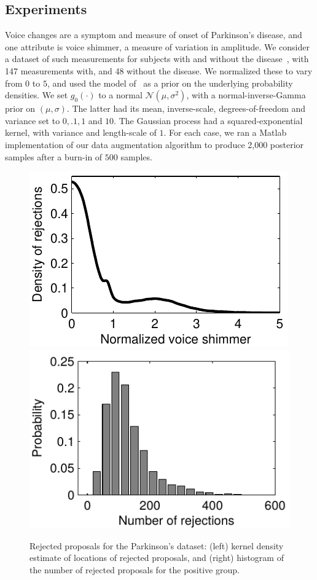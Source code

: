 \subsection{Experiments}   \label{sec:gpds_expt}

  Voice changes are a symptom and measure of onset of Parkinson's disease, and one attribute is voice shimmer, a measure of variation in
  amplitude. We consider a dataset of such measurements for subjects with and without the disease~\citep{little07}, with
147 measurements with, and 48 without the disease.
We normalized these to vary from $0$ to $5$, and  used the model of~\cite{adams_gpds} as a prior on the underlying probability densities. 
We set $g_0(\cdot)$ to a normal $\mathcal{N}(\mu,\sigma^2)$, 
with a normal-inverse-Gamma prior on $(\mu, \sigma)$. The latter had its mean, inverse-scale, degrees-of-freedom and variance
set to $0,.1,1$ and $10$. The Gaussian process had a 
squared-exponential kernel, with variance and length-scale of $1$.
For each case, we ran a Matlab implementation of our data augmentation algorithm to produce 2,000 posterior samples after a burn-in of $500$ samples. 

  \begin{figure}
  \centering
    \includegraphics[width=.35\textwidth]{figs/plot_park_thin.pdf}
    \includegraphics[width=.35\textwidth]{figs/plot_park_thin2.pdf}
\caption{Rejected proposals for the Parkinson's dataset: (left) kernel density estimate of locations of rejected proposals, and (right) histogram of 
the number of rejected proposals for the positive group.}
  \label{fig:plot_glx2}
  \end{figure}


